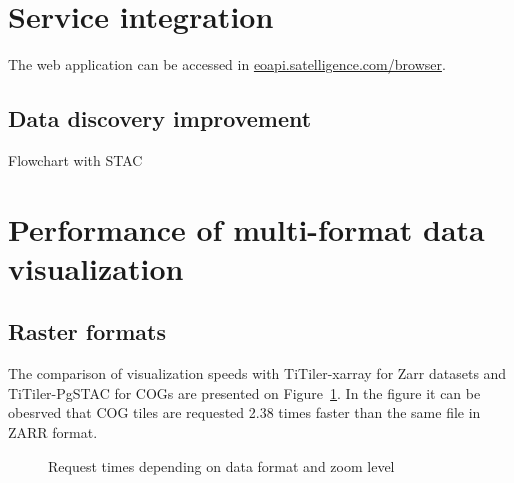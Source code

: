 \documentclass[
  oneside,
  open=any]{scrbook}
\begin{document}
\section{Service integration}\label{service-integration}

The web application can be accessed in
\href{https://eoapi.satelligence.com/browser/?.language=en}{eoapi.satelligence.com/browser}.

\subsection{Data discovery
improvement}\label{data-discovery-improvement}

Flowchart with STAC

\section{Performance of multi-format data
visualization}\label{performance-of-multi-format-data-visualization}

\subsection{Raster formats}\label{raster-formats}

The comparison of visualization speeds with TiTiler-xarray for Zarr
datasets and TiTiler-PgSTAC for COGs are presented on
Figure~\ref{fig-format-comp}. In the figure it can be obesrved that COG
tiles are requested 2.38 times faster than the same file in ZARR format.

\begin{figure}[H]


\caption{\label{fig-format-comp}Request times depending on data format
and zoom level}

\end{figure}%
\end{document}
